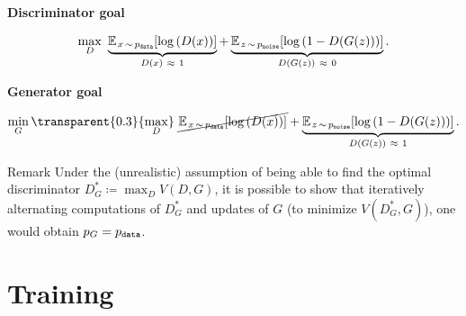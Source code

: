 \documentclass{beamer}
\begin{document}
	\begin{frame}
		\begin{center} \textbf{Discriminator goal} \end{center}
		\begin{equation*}
			\max_{D} \ \underbrace{\mean[x \sim p_\text{\texttt{data}}]{\log{D(x)}}}_{D(x) \ \approx \ 1} + \underbrace{\mean[z \sim p_\text{\texttt{noise}}]{\log{1 - D(G(z))}}}_{D(G(z)) \ \approx \ 0}.
		\end{equation*}
		\begin{center} \textbf{Generator goal} \end{center}
		\begin{equation*}
			\min_{G} {\transparent{0.3}{\max_{D}}} \ \cancel{\mean[x \sim p_\text{\texttt{data}}]{\log{D(x)}}} + \underbrace{\mean[z \sim p_\text{\texttt{noise}}]{\log{1 - D(G(z))}}}_{D(G(z)) \ \approx \ 1}.
		\end{equation*}
		\begin{block}{Remark}
			Under the (unrealistic) assumption of being able to find the optimal discriminator $D^*_G \coloneqq \max_{D} V(D, G)$, it is possible to show that iteratively alternating computations of $D^*_G$ and updates of $G$ (to minimize $V(D^*_G, G)$), one would obtain $p_G = p_{\text{\texttt{data}}}$.
		\end{block}
	\end{frame}

	\section{Training}
\end{document}
